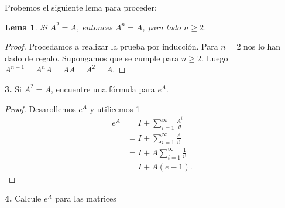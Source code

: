 \documentclass{article}
\newenvironment{statement}[1]{\smallskip\noindent\color[rgb]{1.00,0.00,0.50} {\bf #1.}}{}
\newtheorem{lemma}[theorem]{Lema}
\theoremstyle{definition}
\theoremstyle{remark}
\begin{document}
Probemos el siguiente lema para proceder:

\begin{lemma}\label{lem01}
  Si $A^2 = A$, entonces $A^n = A$, para todo $n \geq 2$.
\end{lemma}
\begin{proof}
  Procedamos a realizar la prueba por inducci\'on.
  Para $n = 2$ nos lo han dado de regalo.
  Supongamos que se cumple para $n \geq 2$.
  Luego $A^{n + 1} = A^n A = A A = A^2 = A$.
\end{proof}

\begin{statement}{3}
  Si $A^2 = A$, encuentre una f\'ormula para $e^A$.
\end{statement}

\begin{proof}
  Desarollemos $e^A$ y utilicemos \cref{lem01}
  \begin{align*}
    e^A &= I + \sum_{i = 1}^{\infty} \frac{A^i}{i!}\\
    &= I + \sum_{i = 1}^{\infty} \frac{A}{i!}\\
    &= I + A \sum_{i = 1}^{\infty} \frac{1}{i!}\\
    &= I + A (e - 1).
  \end{align*}
\end{proof}

\begin{statement}{4}
  Calcule $e^A$ para las matrices
\end{statement}
\end{document}

